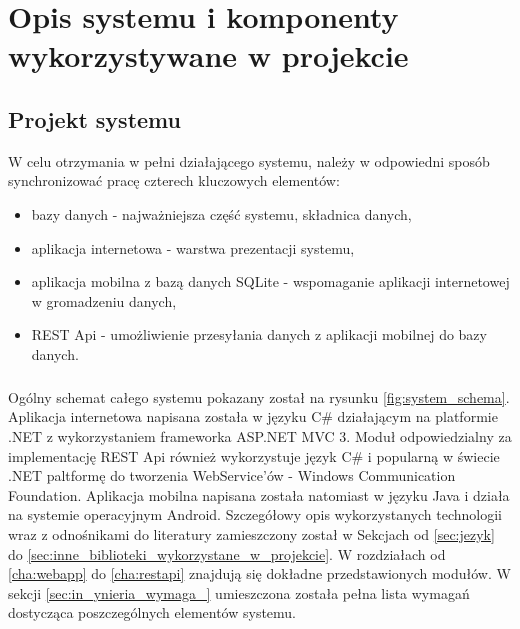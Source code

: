 \chapter{Opis systemu i komponenty wykorzystywane w projekcie}
\label{cha:projektsys}

\section{Projekt systemu} %
\label{sec:projket_systemu}
W celu otrzymania w pełni działającego systemu, należy w odpowiedni sposób synchronizować pracę czterech kluczowych elementów:
\begin{itemize}
	\item bazy danych - najważniejsza część systemu, składnica danych,
	\item aplikacja internetowa - warstwa prezentacji systemu,
	\item aplikacja mobilna z bazą danych SQLite - wspomaganie aplikacji internetowej w gromadzeniu danych,
	\item REST Api - umożliwienie przesyłania danych z aplikacji mobilnej do bazy danych.
\end{itemize}

\paragraph{} %
\label{par:}
Ogólny schemat całego systemu pokazany został na rysunku \ref{fig:system_schema}. Aplikacja internetowa napisana została w języku C\# działającym na platformie .NET z wykorzystaniem frameworka ASP.NET MVC 3. Moduł odpowiedzialny za implementację REST Api również wykorzystuje język C\# i popularną w świecie .NET paltformę do tworzenia WebService'ów - Windows Communication Foundation. Aplikacja mobilna napisana została natomiast w języku Java i działa na systemie operacyjnym Android. Szczegółowy opis wykorzystanych technologii wraz z odnośnikami do literatury zamieszczony został w Sekcjach od \ref{sec:jezyk} do \ref{sec:inne_biblioteki_wykorzystane_w_projekcie}. W rozdziałach od \ref{cha:webapp} do \ref{cha:restapi} znajdują się dokładne przedstawionych modułów. W sekcji \ref{sec:in_ynieria_wymaga_} umieszczona została pełna lista wymagań dostycząca poszczególnych elementów systemu.


